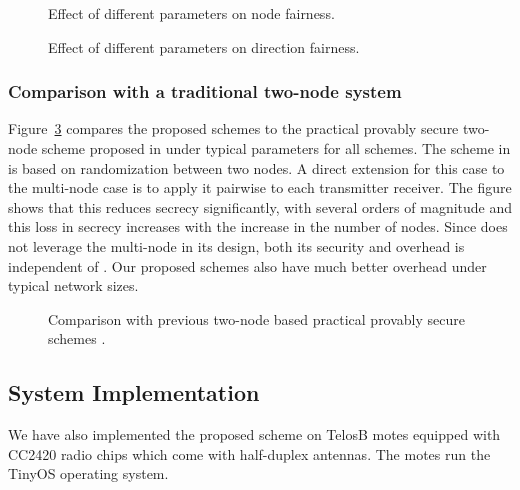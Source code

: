 \documentclass[10pt,letterpaper,conference]{IEEEtran}
\begin{document}
\begin{figure}[!t]
\centering
{}
\caption{Effect of different parameters on node fairness.}
\label{fig:fairness_node}
\end{figure}

\begin{figure}[!t]
\centering
{}
\caption{Effect of different parameters on direction fairness.}
\label{fig:fairness_dir}
\end{figure}

\subsubsection{Comparison with a traditional two-node system}
Figure~\ref{fig:compare} compares the proposed schemes to the practical provably
secure two-node scheme proposed in \cite{Elmorsy} under typical parameters for
all schemes. The scheme in \cite{Elmorsy} is based on randomization between two
nodes. A direct extension for this case to the multi-node case is to apply it
pairwise to each transmitter receiver. The figure shows that this reduces
secrecy significantly, with several orders of magnitude and this loss in secrecy
increases with the increase in the number of nodes. Since \cite{Elmorsy} does
not leverage the multi-node in its design, both its security and overhead is
independent of . Our proposed schemes also have much better overhead under
typical network sizes.

\begin{figure}[!t]
  \centering
\caption{Comparison with previous two-node based practical provably secure
schemes \cite{Elmorsy}.}
  \label{fig:compare}
\end{figure}

\subsection{System Implementation}
We have also implemented the proposed scheme on TelosB motes equipped with CC2420 radio chips which come with
half-duplex antennas. The motes run the TinyOS operating system.
\end{document}
